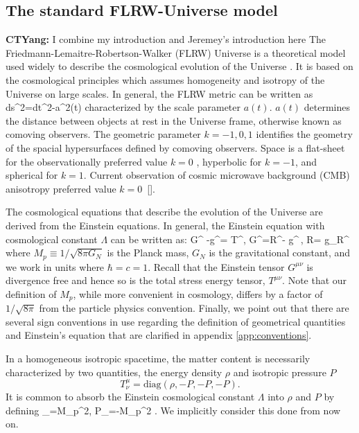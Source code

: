 \subsection{The standard FLRW-Universe model}
{\color{blue}\textbf{CTYang:} I combine my introduction and Jeremey's introduction here}
The Friedmann-Lemaitre-Robertson-Walker (FLRW) Universe is a theoretical model used widely to describe the cosmological evolution of the Universe \cite{hartle2003gravity,hobson,misner1973gravitation}. It is based on the cosmological principles which assumes homogeneity and isotropy of the Universe on large scales. In general, the FLRW metric can be written as
\beqn\label{metric}
ds^2=dt^2-a^2(t)%
\eeqn
characterized  by the scale parameter $a(t)$.  $a(t)$ determines the distance between objects at rest in the Universe frame, otherwise known as comoving observers. The geometric parameter $k=-1,0,1$ identifies the geometry of the spacial hypersurfaces defined by comoving observers. Space is a flat-sheet for the observationally preferred value $k=0$ \cite{Planck}, hyperbolic for $k=-1$, and spherical for $k=1$. Current observation of cosmic microwave background (CMB) anisotropy preferred value $k=0$~[\cite{Planck:2013pxb,Planck:2015fie,Planck:2018vyg}].

The cosmological equations that describe the evolution of the Universe are derived from the Einstein equations. In general, the Einstein equation with cosmological constant $\Lambda$ can be written as:
\beqn\label{Einstine}
G^{\mu\nu} -\Lambda g^{\mu\nu}= T^{\mu\nu},  \quad G^{\mu\nu}=R^{\mu\nu}- g^{\mu\nu}\,,
\quad R= g_{\mu\nu}R^{\mu\nu}
\eeqn
where $M_p\equiv 1/\sqrt{8\pi G_N}$ is the Planck mass, $G_N$ is the gravitational constant, and we work in units where $\hbar=c=1$. Recall that the Einstein tensor $G^{\mu\nu}$ is divergence free and hence so is the total stress energy tensor, $T^{\mu\nu}$.  Note that our definition of $M_p$, while more convenient in cosmology, differs by a factor of $1/\sqrt{8\pi}$ from the particle physics convention.  Finally, we point out that there are several sign conventions in use regarding the definition of geometrical quantities and Einstein's equation that are clarified in appendix \ref{app:conventions}.

 In a homogeneous isotropic spacetime, the matter content is necessarily characterized by two quantities, the energy density $\rho$ and isotropic pressure $P$
\begin{equation}
  T^\mu_\nu =\mathrm{diag}(\rho, -P, -P, -P).
\end{equation}
 It is common to absorb the Einstein cosmological constant $\Lambda$ into $\rho$ and $P$ by defining
\beqn\label{EpsLam}
\rho_\Lambda=M_p^2\Lambda, \qquad P_\Lambda=-M_p^2 \Lambda.
\eeqn
We implicitly consider this done from now on. 


